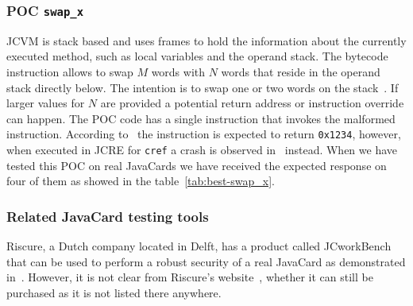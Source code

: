 \documentclass{../llncs/llncs}
\begin{document}

\subsubsection{POC \texttt{swap_x}}
JCVM is stack based and uses frames to hold the information about the currently executed method, such as local variables and the operand stack. The bytecode instruction \swapx allows to swap $M$ words with $N$ words that reside in the operand stack directly below. The intention is to swap one or two words on the stack~\cite{jcspecs31download}. If larger values for $N$ are provided a potential return address or instruction override can happen.
The POC code has a single instruction \triggerswapx that invokes the malformed \swapx instruction. According to~\cite{se:oracle:part1} the instruction is expected to return \texttt{0x1234}, however, when executed in JCRE for \texttt{cref} a crash is observed in~\cite{se:oracle:part1} instead. When we have tested this POC on real JavaCards we have received the expected response
on four of them as showed in the table~\ref{tab:best-swap_x}.


\subsubsection{Related JavaCard testing tools}
Riscure, a Dutch company located in Delft, has a product called JCworkBench that can be used to perform a robust security of a real JavaCard as demonstrated in~\cite{jcworkbench,riscurejcworkbenchpdf}. However, it is not clear from Riscure's website~\cite{riscureweb}, whether it can still be purchased as it is not listed there anywhere.\footnotemark
\end{document}
